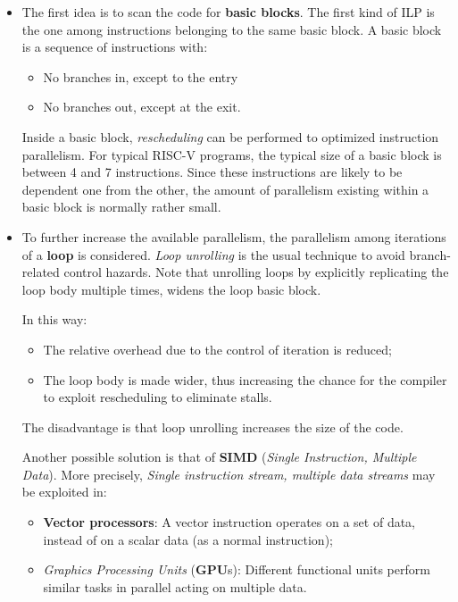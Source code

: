 \documentclass[a4paper,11pt]{article}
\begin{document}
\begin{itemize}
	\item The first idea is to scan the code for \textbf{basic blocks}.
	      The first kind of ILP is the one among instructions belonging to the same basic block.
	      A basic block is a sequence of instructions with:
	      \begin{itemize}
		      \item No branches in, except to the entry
		      \item No branches out, except at the exit.
	      \end{itemize}

	      Inside a basic block, \textit{rescheduling} can be performed to optimized instruction parallelism.
	      For typical RISC-V programs, the typical size of a
	      basic block is between 4 and 7 instructions.
	      Since these instructions are likely to be dependent
	      one from the other, the amount of parallelism existing
	      within a basic block is normally rather small.

	\item To further increase the available parallelism, the parallelism among iterations of a \textbf{loop} is considered. \textit{Loop unrolling} is the usual technique to avoid branch-related control hazards. Note that unrolling loops by explicitly replicating the loop body multiple times, widens the loop basic block.

	      In this way:
	      \begin{itemize}
		      \item The relative overhead due to the control of iteration is reduced;
		      \item The loop body is made wider, thus increasing the
		            chance for the compiler to exploit rescheduling to
		            eliminate stalls.
	      \end{itemize}

	      The disadvantage is that loop unrolling increases the size of the code.

	      \par\smallskip

	      Another possible solution is that of \textbf{SIMD} (\textit{Single Instruction, Multiple Data}).
	      More precisely, \textit{Single instruction stream, multiple data streams} may be exploited in:
	      \begin{itemize}
		      \item \textbf{Vector processors}:
		            A vector instruction operates on a set of data, instead
		            of on a scalar data (as a normal instruction);
		      \item \textit{Graphics Processing Units} (\textbf{GPU}s):
		            Different functional units perform similar tasks in
		            parallel acting on multiple data.
	      \end{itemize}

\end{itemize}
\end{document}
